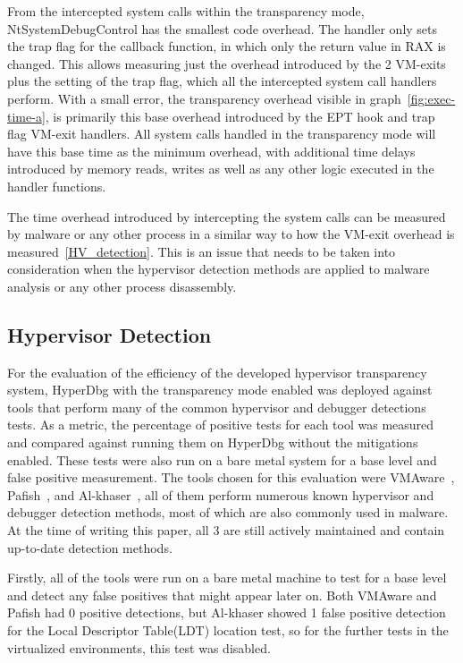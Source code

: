 From the intercepted system calls within the transparency mode, NtSystemDebugControl has the smallest code overhead. 
The handler only sets the trap flag for the callback function, in which only the return value in RAX is changed. 
This allows measuring just the overhead introduced by the 2 VM-exits plus the setting of the trap flag, which all the intercepted system call handlers perform. 
With a small error, the transparency overhead visible in graph~\ref{fig:exec-time-a}, is primarily this base overhead introduced by the EPT hook and trap flag VM-exit handlers. 
All system calls handled in the transparency mode will have this base time as the minimum overhead, with additional time delays introduced by memory reads, writes 
as well as any other logic executed in the handler functions.

The time overhead introduced by intercepting the system calls can be measured by malware or any other process in a similar way to how the VM-exit overhead is measured~\ref{HV_detection}. 
This is an issue that needs to be taken into consideration when the hypervisor detection methods are applied to malware analysis or any other process disassembly.

\subsection{Hypervisor Detection}\label{HV-detection-eval}
For the evaluation of the efficiency of the developed hypervisor transparency system, HyperDbg with the transparency mode enabled was deployed against tools that perform many of 
the common hypervisor and debugger detections tests. As a metric, the percentage of positive tests for each tool was measured and compared against running them on HyperDbg 
without the mitigations enabled. These tests were also run on a bare metal system for a base level and false positive measurement. 
The tools chosen for this evaluation were VMAware~\cite{vmaware}, Pafish~\cite{pafish}, and Al-khaser~\cite{al-khaser}, all of them perform numerous known hypervisor and debugger detection methods, 
most of which are also commonly used in malware. At the time of writing this paper, all 3 are still actively maintained and contain up-to-date detection methods.

Firstly, all of the tools were run on a bare metal machine to test for a base level and detect any false positives that might appear later on. 
Both VMAware and Pafish had 0 positive detections, but Al-khaser showed 1 false positive detection for the Local Descriptor Table(LDT) location test, 
so for the further tests in the virtualized environments, this test was disabled.

